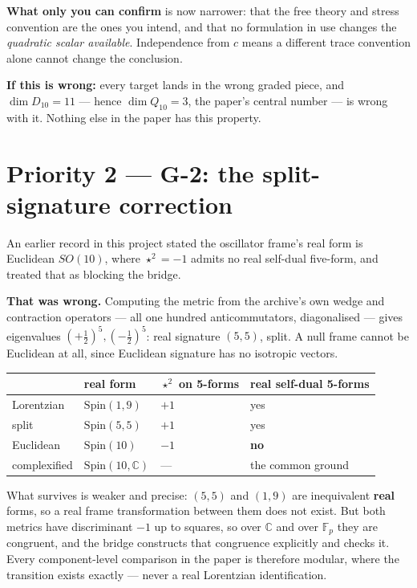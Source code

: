 \documentclass[11pt,a4paper]{article}
\begin{document}
\textbf{What only you can confirm} is now narrower: that the free theory and
stress convention are the ones you intend, and that no formulation in use changes
the \emph{quadratic scalar available}. Independence from $c$ means a different
trace convention alone cannot change the conclusion.

\textbf{If this is wrong:} every target lands in the wrong graded piece, and
$\dim D_{10} = 11$ --- hence $\dim Q_{10} = 3$, the paper's central number --- is
wrong with it. Nothing else in the paper has this property.

\section*{Priority 2 --- G-2: the split-signature correction}

An earlier record in this project stated the oscillator frame's real form is
Euclidean $SO(10)$, where $\star^2 = -1$ admits no real self-dual five-form, and
treated that as blocking the bridge.

\textbf{That was wrong.} Computing the metric from the archive's own wedge and
contraction operators --- all one hundred anticommutators, diagonalised --- gives
eigenvalues $(+\tfrac12)^5, (-\tfrac12)^5$: real signature $(5,5)$, split. A null
frame cannot be Euclidean at all, since Euclidean signature has no isotropic
vectors.

\begin{center}
\begin{tabular}{llll}
\toprule
 & real form & $\star^2$ on 5-forms & real self-dual 5-forms \\
\midrule
Lorentzian   & $\mathrm{Spin}(1,9)$            & $+1$ & yes \\
split        & $\mathrm{Spin}(5,5)$            & $+1$ & yes \\
Euclidean    & $\mathrm{Spin}(10)$             & $-1$ & \textbf{no} \\
complexified & $\mathrm{Spin}(10,\mathbb{C})$  & ---  & the common ground \\
\bottomrule
\end{tabular}
\end{center}

What survives is weaker and precise: $(5,5)$ and $(1,9)$ are inequivalent
\textbf{real} forms, so a real frame transformation between them does not exist.
But both metrics have discriminant $-1$ up to squares, so over $\mathbb{C}$ and
over $\mathbb{F}_p$ they are congruent, and the bridge constructs that congruence
explicitly and checks it. Every component-level comparison in the paper is
therefore modular, where the transition exists exactly --- never a real Lorentzian
identification.
\end{document}

